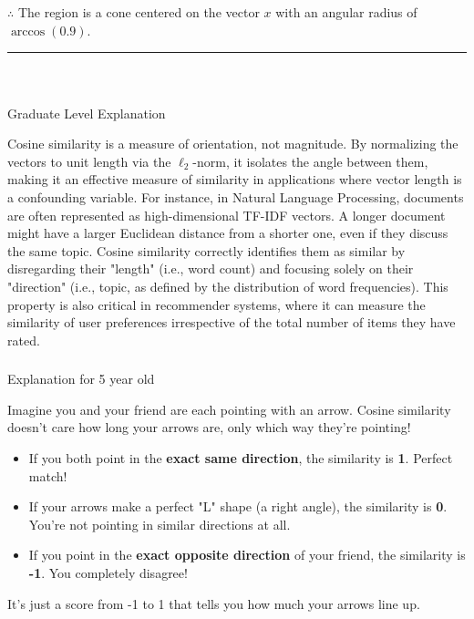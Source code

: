 \documentclass{article}
\begin{document}
\subsubsection*{\normalfont}{$\therefore$ The region is a cone centered on the vector $x$ with an angular radius of $\arccos(0.9)$.}

\noindent\rule{\textwidth}{0.4pt}\\

\newpage

\subsubsection*{\normalfont}{Graduate Level Explanation}

\parbox{\textwidth}{
Cosine similarity is a measure of orientation, not magnitude. By normalizing the vectors to unit length via the $\ell_2$-norm, it isolates the angle between them, making it an effective measure of similarity in applications where vector length is a confounding variable. For instance, in Natural Language Processing, documents are often represented as high-dimensional TF-IDF vectors. A longer document might have a larger Euclidean distance from a shorter one, even if they discuss the same topic. Cosine similarity correctly identifies them as similar by disregarding their "length" (i.e., word count) and focusing solely on their "direction" (i.e., topic, as defined by the distribution of word frequencies). This property is also critical in recommender systems, where it can measure the similarity of user preferences irrespective of the total number of items they have rated.
}

\subsubsection*{\normalfont}{Explanation for 5 year old}

\parbox{\textwidth}{
Imagine you and your friend are each pointing with an arrow. Cosine similarity doesn't care how long your arrows are, only which way they're pointing!
\begin{itemize}
    \item If you both point in the \textbf{exact same direction}, the similarity is \textbf{1}. Perfect match!
    \item If your arrows make a perfect "L" shape (a right angle), the similarity is \textbf{0}. You're not pointing in similar directions at all.
    \item If you point in the \textbf{exact opposite direction} of your friend, the similarity is \textbf{-1}. You completely disagree!
\end{itemize}
It's just a score from -1 to 1 that tells you how much your arrows line up.
}
\end{document}
